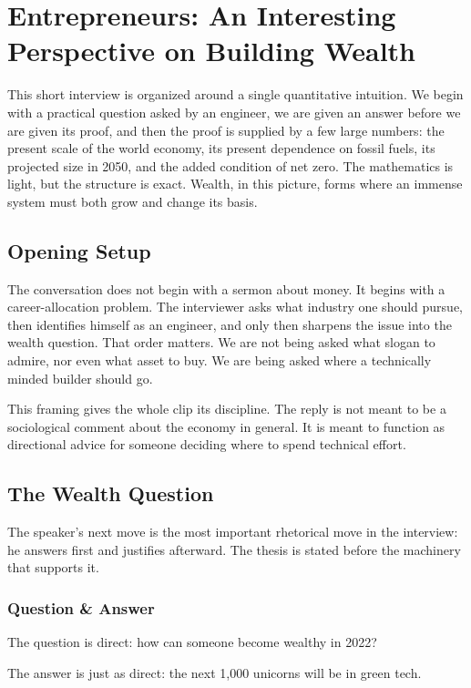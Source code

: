 \chapter{Entrepreneurs: An Interesting Perspective on Building Wealth}

This short interview is organized around a single quantitative intuition. We begin with a practical question asked by an engineer, we are given an answer before we are given its proof, and then the proof is supplied by a few large numbers: the present scale of the world economy, its present dependence on fossil fuels, its projected size in 2050, and the added condition of net zero. The mathematics is light, but the structure is exact. Wealth, in this picture, forms where an immense system must both grow and change its basis.

\section{Opening Setup}

The conversation does not begin with a sermon about money. It begins with a career-allocation problem. The interviewer asks what industry one should pursue, then identifies himself as an engineer, and only then sharpens the issue into the wealth question. That order matters. We are not being asked what slogan to admire, nor even what asset to buy. We are being asked where a technically minded builder should go.

This framing gives the whole clip its discipline. The reply is not meant to be a sociological comment about the economy in general. It is meant to function as directional advice for someone deciding where to spend technical effort.

\section{The Wealth Question}

The speaker's next move is the most important rhetorical move in the interview: he answers first and justifies afterward. The thesis is stated before the machinery that supports it.

\subsection{Question \& Answer}

The question is direct: how can someone become wealthy in 2022?

The answer is just as direct: the next 1{,}000 unicorns will be in green tech.

